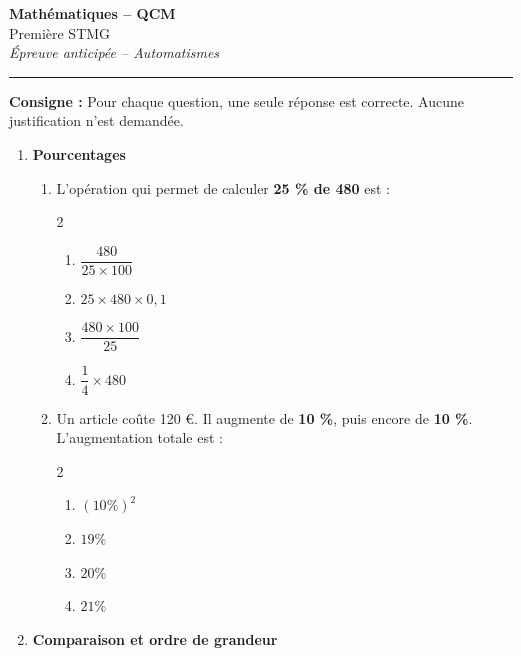 \documentclass[12pt,a4paper]{article}
\begin{document}
\begin{center}
    {\Large \textbf{Mathématiques – QCM}}\\[2mm]
    {\large Première STMG}\\[2mm]
    \textit{Épreuve anticipée – Automatismes}
\end{center}

\vspace{0.4cm}
\hrule
\vspace{0.5cm}

\textbf{Consigne :} Pour chaque question, une seule réponse est correcte.  
Aucune justification n’est demandée.

\vspace{0.5cm}


\begin{enumerate}

\item \textbf{Pourcentages}

\begin{enumerate}[label=\arabic{*}.\arabic*]
\item L’opération qui permet de calculer \textbf{25 \% de 480} est :
\begin{multicols}{2}
\begin{enumerate}[label=\alph*)]
\item $\dfrac{480}{25 \times 100}$
\item $25 \times 480 \times 0{,}1$
\item $\dfrac{480 \times 100}{25}$
\item $\dfrac{1}{4} \times 480$
\end{enumerate}
\end{multicols}

\item Un article coûte 120 €. Il augmente de \textbf{10 \%}, puis encore de \textbf{10 \%}.  
L’augmentation totale est :
\begin{multicols}{2}
\begin{enumerate}[label=\alph*)]
\item $(10 \%)^2$
\item $19 \%$
\item $20 \%$
\item $21 \%$
\end{enumerate}
\end{multicols}
\end{enumerate}

\item \textbf{Comparaison et ordre de grandeur}


\end{enumerate}
\end{document}
